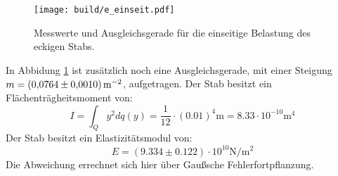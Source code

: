 \begin{figure}[H]
    \centering
    \texttt{[image: build/e\_einseit.pdf]}
    \caption{Messwerte und Ausgleichsgerade für die einseitige Belastung des eckigen Stabs.}
    \label{fig:plot2}
\end{figure}
In Abbidung \ref{fig:plot2} ist zusätzlich noch eine Ausgleichsgerade, mit einer Steigung $m=\SI[per-mode=reciprocal]{0.0764\pm0.001}{\per\meter\squared}$, aufgetragen.
Der Stab besitzt ein Flächenträgheitsmoment von:
\begin{equation*}
  I=\int_Q y^2 dq(y) = \frac{1}{12}\cdot (0.01)^4\si{\meter} = 8.33\cdot 10^{-10}\si{\meter}^4
\end{equation*}
Der Stab besitzt ein Elastizitätsmodul von:
\begin{equation*}
  E= (9.334\pm 0.122)\cdot10^{10} \si{\newton\per\meter\squared}
\end{equation*}
Die Abweichung errechnet sich hier über Gaußsche Fehlerfortpflanzung.
%
